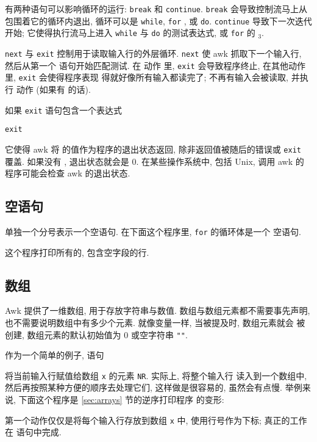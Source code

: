 有两种语句可以影响循环的运行: \verb'break' 和 \verb'continue'. \verb'break'
会导致控制流马上从包围着它的循环内退出, 循环可以是 \verb'while', \verb'for'
, 或 \verb'do'. \verb'continue' 导致下一次迭代开始; 它使得执行流马上进入
\verb'while' 与 \verb'do' 的测试表达式, 或 \verb'for' 的 \expr$_3$.

\verb'next' 与 \verb'exit' 控制用于读取输入行的外层循环. \verb'next' 使
awk 抓取下一个输入行, 然后从第一个 \patact 语句开始匹配测试. 在 \END 动作
里, \verb'exit' 会导致程序终止, 在其他动作里, \verb'exit' 会使得程序表现
得就好像所有输入都读完了; 不再有输入会被读取, 并执行 \END 动作 (如果有 \END
的话).

如果 \verb'exit' 语句包含一个表达式
\begin{pattern}
    \verb'exit' \expr
\end{pattern}
它使得 awk 将 \expr 的值作为程序的退出状态返回, 除非返回值被随后的错误或
\verb'exit' 覆盖. 如果没有 \expr, 退出状态就会是 0. 在某些操作系统中, 包括
Unix, 调用 awk 的程序可能会检查  awk 的退出状态.

\subsection{空语句}
\label{subsec:empty_statement}

单独一个分号表示一个空语句. 在下面这个程序里, \verb'for' 的循环体是一个
空语句.
这个程序打印所有的, 包含空字段的行.

\subsection{数组}
\label{subsec:arrays}

Awk 提供了一维数组, 用于存放字符串与数值. 数组与数组元素都不需要事先声明,
也不需要说明数组中有多少个元素. 就像变量一样, 当被提及时, 数组元素就会
被创建, 数组元素的默认初始值为 0 或空字符串
\verb'""'.

作为一个简单的例子, 语句
将当前输入行赋值给数组 \verb'x' 的元素 \verb'NR'. 实际上, 将整个输入行
读入到一个数组中, 然后再按照某种方便的顺序去处理它们, 这样做是很容易的,
虽然会有点慢. 举例来说, 下面这个程序是 \ref{sec:arrays} 节的逆序打印程序
的变形:
第一个动作仅仅是将每个输入行存放到数组 \verb'x' 中, 使用行号作为下标;
真正的工作在 \END 语句中完成.

